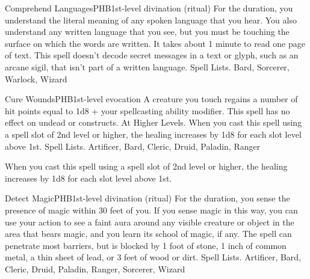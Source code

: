 \begin{spell}{Comprehend Languages}{PHB}{1st-level divination (ritual)}
{
}
For the duration, you understand the literal meaning of any spoken language that you hear. You also understand any written language that you see, but you must be touching the surface on which the words are written. It takes about 1 minute to read one page of text.
This spell doesn’t decode secret messages in a text or glyph, such as an arcane sigil, that isn’t part of a written language.
Spell Lists. Bard, Sorcerer, Warlock, Wizard
\end{spell}

\begin{spell}{Cure Wounds}{PHB}{1st-level evocation}
{
}
A creature you touch regains a number of hit points equal to 1d8 + your spellcasting ability modifier. This spell has no effect on undead or constructs.
At Higher Levels. When you cast this spell using a spell slot of 2nd level or higher, the healing increases by 1d8 for each slot level above 1st.
Spell Lists. Artificer, Bard, Cleric, Druid, Paladin, Ranger

 When you cast this spell using a spell slot of 2nd level or higher, the healing increases by 1d8 for each slot level above 1st.
\end{spell}

\begin{spell}{Detect Magic}{PHB}{1st-level divination (ritual)}
{
}
For the duration, you sense the presence of magic within 30 feet of you. If you sense magic in this way, you can use your action to see a faint aura around any visible creature or object in the area that bears magic, and you learn its school of magic, if any.
The spell can penetrate most barriers, but is blocked by 1 foot of stone, 1 inch of common metal, a thin sheet of lead, or 3 feet of wood or dirt.
Spell Lists. Artificer, Bard, Cleric, Druid, Paladin, Ranger, Sorcerer, Wizard
\end{spell}

